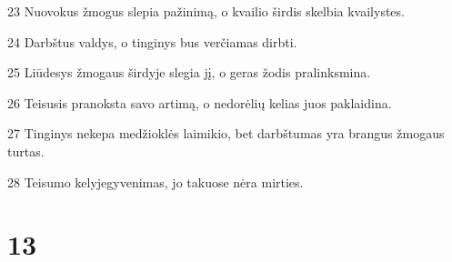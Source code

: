 \par 23 Nuovokus žmogus slepia pažinimą, o kvailio širdis skelbia kvailystes. 
\par 24 Darbštus valdys, o tinginys bus verčiamas dirbti. 
\par 25 Liūdesys žmogaus širdyje slegia jį, o geras žodis pralinksmina. 
\par 26 Teisusis pranoksta savo artimą, o nedorėlių kelias juos paklaidina. 
\par 27 Tinginys nekepa medžioklės laimikio, bet darbštumas yra brangus žmogaus turtas. 
\par 28 Teisumo kelyje­gyvenimas, jo takuose nėra mirties.



\chapter{13}


